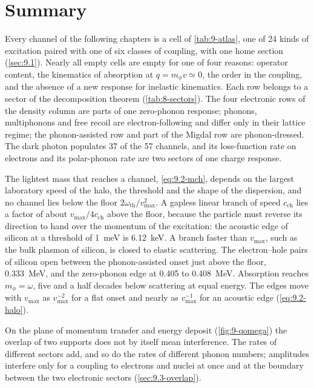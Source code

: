\section*{Summary}

Every channel of the following chapters is a cell of \cref{tab:9-atlas}, one of 24 kinds of excitation paired with one of six classes of coupling, with one home section (\cref{sec:9.1}). Nearly all empty cells are empty for one of four reasons: operator content, the kinematics of absorption at $q = m_\phi v \simeq 0$, the order in the coupling, and the absence of a new response for inelastic kinematics. Each row belongs to a sector of the decomposition theorem (\cref{tab:8-sectors}). The four electronic rows of the density column are parts of one zero-phonon response; phonons, multiphonons and free recoil are electron-following and differ only in their lattice regime; the phonon-assisted row and part of the Migdal row are phonon-dressed. The dark photon populates 37 of the 57 channels, and its loss-function rate on electrons and its polar-phonon rate are two sectors of one charge response.

The lightest mass that reaches a channel, \cref{eq:9.2-mch}, depends on the largest laboratory speed of the halo, the threshold and the shape of the dispersion, and no channel lies below the floor $2\omega_{\mathrm{th}}/v_{\mathrm{max}}^2$. A gapless linear branch of speed $c_{\mathrm{ch}}$ lies a factor of about $v_{\mathrm{max}}/4c_{\mathrm{ch}}$ above the floor, because the particle must reverse its direction to hand over the momentum of the excitation: the acoustic edge of silicon at a threshold of \SI{1}{meV} is \SI{6.12}{keV}. A branch faster than $v_{\mathrm{max}}$, such as the bulk plasmon of silicon, is closed to elastic scattering. The electron--hole pairs of silicon open between the phonon-assisted onset just above the floor, \SI{0.333}{MeV}, and the zero-phonon edge at 0.405 to \SI{0.408}{MeV}. Absorption reaches $m_\phi = \omega$, five and a half decades below scattering at equal energy. The edges move with $v_{\mathrm{max}}$ as $v_{\mathrm{max}}^{-2}$ for a flat onset and nearly as $v_{\mathrm{max}}^{-1}$ for an acoustic edge (\cref{eq:9.2-halo}).

On the plane of momentum transfer and energy deposit (\cref{fig:9-qomega}) the overlap of two supports does not by itself mean interference. The rates of different sectors add, and so do the rates of different phonon numbers; amplitudes interfere only for a coupling to electrons and nuclei at once and at the boundary between the two electronic sectors (\cref{sec:9.3-overlap}).


